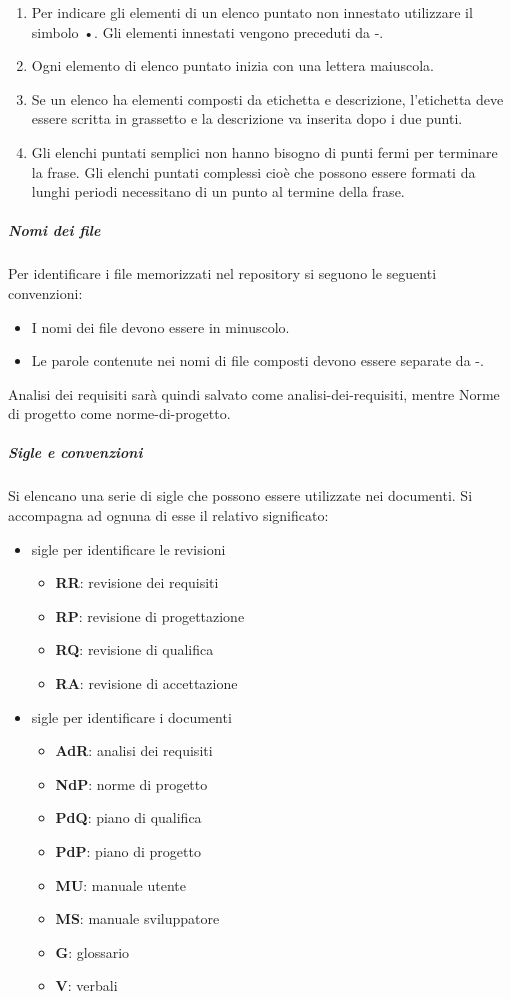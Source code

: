 \documentclass[../norme-di-progetto.tex]{subfiles}
\begin{document}
\begin{enumerate}
  \item Per indicare gli elementi di un elenco puntato non innestato utilizzare il simbolo •. Gli elementi innestati vengono preceduti da -.
  \item Ogni elemento di elenco puntato inizia con una lettera maiuscola.
  \item Se un elenco ha elementi composti da etichetta e descrizione, l'etichetta deve essere scritta in grassetto e la descrizione va inserita dopo i due punti.
  \item Gli elenchi puntati semplici non hanno bisogno di punti fermi per terminare la frase. Gli elenchi puntati complessi cioè che possono essere formati da lunghi periodi necessitano di un punto al termine della frase.
\end{enumerate}

\subparagraph{Nomi dei file}%
\label{nomi_dei_file}
Per identificare i file memorizzati nel repository si seguono le seguenti convenzioni:

\begin{itemize}
  \item I nomi dei file devono essere in minuscolo.
  \item Le parole contenute nei nomi di file composti devono essere separate da -.
\end{itemize}

Analisi dei requisiti sarà quindi salvato come analisi-dei-requisiti, mentre Norme di progetto come norme-di-progetto.

\subparagraph{Sigle e convenzioni}%
\label{sigle_e_convenzioni}
Si elencano una serie di sigle che possono essere utilizzate nei documenti. Si accompagna ad ognuna di esse il relativo significato:

\begin{itemize}
  \item sigle per identificare le revisioni
  \begin{itemize}
    \item \textbf{RR}: revisione dei requisiti
    \item \textbf{RP}: revisione di progettazione
    \item \textbf{RQ}: revisione di qualifica
    \item \textbf{RA}: revisione di accettazione
  \end{itemize}
  \item sigle per identificare i documenti
  \begin{itemize}
    \item \textbf{AdR}: analisi dei requisiti
    \item \textbf{NdP}: norme di progetto
    \item \textbf{PdQ}: piano di qualifica
    \item \textbf{PdP}: piano di progetto
    \item \textbf{MU}: manuale utente
    \item \textbf{MS}: manuale sviluppatore
    \item \textbf{G}: glossario
    \item \textbf{V}: verbali
   \end{itemize}
 \end{itemize}
\end{document}
